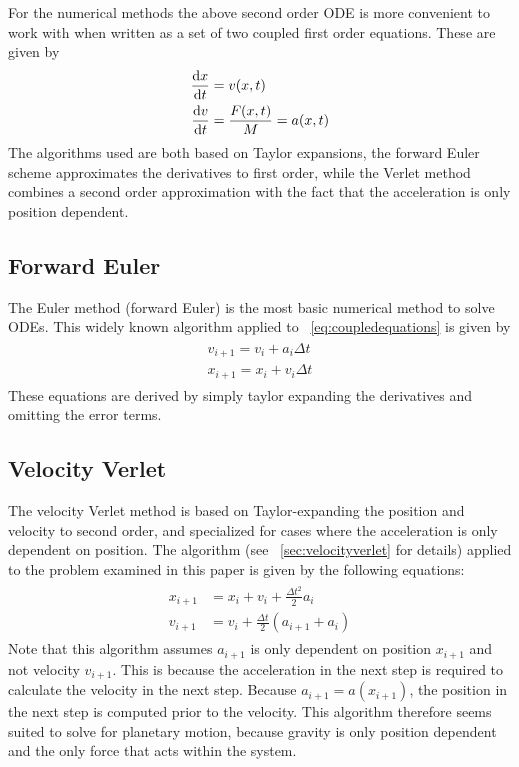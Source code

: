 \documentclass[aps,reprint]{revtex4-1}
\begin{document}
For the numerical methods the above second order ODE is more convenient to
work with when written as a set of two coupled first order equations. These
are given by
\begin{align}
  \begin{split}
  \label{eq:coupledequations}
  \dv{x}{t} &= v(x,t) \\
  \dv{v}{t} &= \frac{F(x,t)}{M} = a(x,t)
  \end{split}
\end{align}
The algorithms used are both based on Taylor expansions, the forward Euler
scheme approximates the derivatives to first order, while the Verlet
method combines a second order approximation with the fact that the acceleration
is only position dependent.
\subsection{Forward Euler}
The Euler method (forward Euler) is the most basic numerical method to solve
ODEs. This widely known algorithm applied to ~\ref{eq:coupledequations} is given by
\begin{align*}
  \begin{split}
  v_{i+1} = v_{i} + a_{i}\Delta{t} \\
  x_{i+1} = x_{i} + v_{i}\Delta{t}
\end{split}
\end{align*}
These equations are derived by simply taylor expanding the derivatives and omitting
the error terms.
\subsection{Velocity Verlet}
The velocity Verlet method is based on Taylor-expanding the position and velocity
to second order, and specialized for cases where the acceleration is only
dependent on position. The algorithm (see ~\ref{sec:velocityverlet} for details)
applied to the problem examined in this paper is given by the following equations:
\begin{align}
  \begin{split}
    x_{i+1} &= x_i + v_i + \frac{\Delta{t}^2}{2} a_i \\
    v_{i+1} &= v_i + \frac{\Delta{t}}{2}(a_{i+1} + a_{i})
  \end{split}
\end{align}
Note that this algorithm assumes $a_{i+1}$ is only dependent on position $x_{i+1}$
and not velocity $v_{i+1}$. This is because the acceleration in the next step
is required to calculate the velocity in the next step. Because $a_{i+1} = a(x_{i+1})$,
the position in the next step is computed prior to the velocity. This algorithm
therefore seems suited to solve for planetary motion, because gravity is only
position dependent and the only force that acts within the system.
\end{document}
